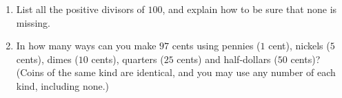 \begin{enumerate}
\item[(a)] List all the positive divisors of $100$, and explain how to be sure that none is missing.
\item[(b)] In how many ways can you make $97$ cents using pennies ($1$ cent), nickels ($5$ cents), dimes ($10$ cents), quarters ($25$ cents) and half-dollars ($50$ cents)? (Coins of the same kind are identical, and you may use any number of each kind, including none.)
\end{enumerate}

